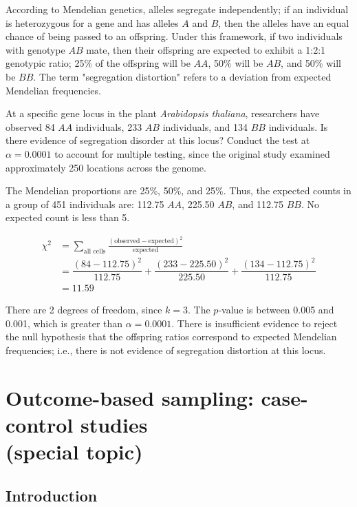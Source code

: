 \begin{example}{According to Mendelian genetics, alleles segregate independently; if an individual is heterozygous for a gene and has alleles $A$ and $B$, then the alleles have an equal chance of being passed to an offspring. Under this framework, if two individuals with genotype $AB$ mate, then their offspring are expected to exhibit a 1:2:1 genotypic ratio; 25\% of the offspring will be $AA$, 50\% will be $AB$, and 50\% will be $BB$. The term "segregation distortion" refers to a deviation from expected Mendelian frequencies. 
		
At a specific gene locus in the plant \textit{Arabidopsis thaliana}, researchers have observed 84 $AA$ individuals, 233 $AB$ individuals, and 134 $BB$ individuals. Is there evidence of segregation disorder at this locus? Conduct the test at $\alpha = 0.0001$ to account for multiple testing, since the original study examined approximately 250 locations across the genome. 
}

The Mendelian proportions are 25\%, 50\%, and 25\%. Thus, the expected counts in a group of 451 individuals are: 112.75 $AA$, 225.50 $AB$, and 112.75 $BB$. No expected count is less than 5.

\begin{align*}
\chi^2 &= \sum_{\text{all cells}} \frac{(\text{observed} - \text{expected})^2}{\text{expected}} \\
&= \dfrac{(84-112.75)^2}{112.75} + \dfrac{(233-225.50)^2}{225.50} + \dfrac{(134-112.75)^2}{112.75}\\
&=11.59
\end{align*}

There are 2 degrees of freedom, since $k = 3$. The $p$-value is between 0.005 and 0.001, which is greater than $\alpha = 0.0001$. There is insufficient evidence to reject the null hypothesis that the offspring ratios correspond to expected Mendelian frequencies; i.e., there is not evidence of segregation distortion at this locus.

\end{example}

\section{Outcome-based sampling: case-control studies\\(special topic)}
\label{caseControStudies}


\subsection{Introduction}

